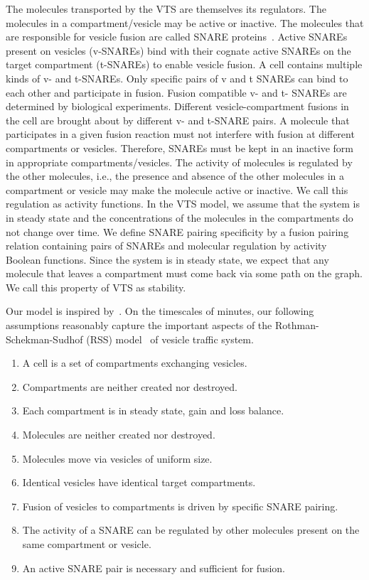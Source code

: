 The molecules transported by the VTS are themselves its regulators. The molecules in a
compartment/vesicle may be active or inactive. The molecules that are responsible for vesicle fusion
are called SNARE proteins~\cite{jahn2006snares, wickner2008membrane}. Active SNAREs present on vesicles (v-SNAREs) bind with their
cognate active SNAREs on the target compartment (t-SNAREs) to enable vesicle fusion. A cell
contains multiple kinds of v- and t-SNAREs. Only specific pairs of v and t SNAREs can bind to
each other and participate in fusion. Fusion compatible v- and t- SNAREs are determined by
biological experiments. Different vesicle-compartment fusions in the cell are brought about by
different v- and t-SNARE pairs. A molecule that participates in a given fusion reaction must not
interfere with fusion at different compartments or vesicles. Therefore, SNAREs must be kept in an
inactive form in appropriate compartments/vesicles. The activity of molecules is regulated by the
other molecules, i.e., the presence and absence of the other molecules in a compartment or vesicle
may make the molecule active or inactive. We call this regulation as activity functions.
In the VTS model, we assume that the system is in steady state and the concentrations of the
molecules in the compartments do not change over time. We define SNARE pairing specificity by a
fusion pairing relation containing pairs of SNAREs and molecular regulation by activity Boolean
functions. Since the system is in steady state, we expect that any molecule that leaves a
compartment must come back via some path on the graph. We call this property of VTS as stability.

Our model is inspired by~\cite{shukla2017discovering}. On the timescales of minutes, our following assumptions reasonably capture the important aspects of the Rothman-Schekman-Sudhof (RSS) model~\cite{rothman2002machinery} of vesicle traffic system.
\begin{enumerate}
\item A cell is a set of compartments exchanging vesicles.
\item Compartments are neither created nor destroyed.
\item Each compartment is in steady state, gain and loss balance.
\item Molecules are neither created nor destroyed.
\item Molecules move via vesicles of uniform size.
\item Identical vesicles have identical target compartments.
\item Fusion of vesicles to compartments is driven by specific SNARE pairing.
\item The activity of a SNARE can be regulated by other molecules present on the same compartment
or vesicle.
\item An active SNARE pair is necessary and sufficient for fusion. 
\end{enumerate}
 
